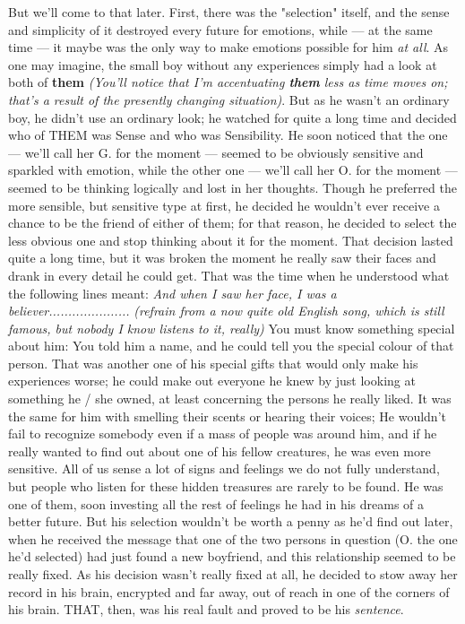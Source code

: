 But we'll come to that later. First, there was the "selection" itself, and the sense and simplicity of it destroyed every future for emotions, while --- at the same time --- it maybe was the only way to make emotions possible for him \emph{at all}. 
As one may imagine, the small boy without any experiences simply had a look at both of \textbf{them} \emph{(You'll notice that I'm accentuating \textbf{them} less as time moves on; that's a result of the presently changing situation)}. But as he wasn't an ordinary boy, he didn't use an ordinary look; he watched for quite a long time and decided who of THEM was Sense and who was Sensibility. He soon noticed that the one --- we'll call her G. for the moment --- seemed to be obviously sensitive and sparkled with emotion, while the other one --- we'll call her O. for the moment --- seemed to be thinking logically and lost in her thoughts. Though he preferred the more sensible, but sensitive type at first, he decided he wouldn't ever receive a chance to be the friend of either of them; for that reason, he decided to select the less obvious one and stop thinking about it for the moment. That decision lasted quite a long time, but it was broken the moment he really saw their faces and drank in every detail he could get.
That was the time when he understood what the following lines meant:
\emph{And when I saw her face,
I was a believer.....................}
\emph{(refrain from a now quite old English song, which is still famous, but nobody I know listens to it, really)}
You must know something special about him: You told him a name, and he could tell you the special colour of that person. That was another one of his special gifts that would only make his experiences worse; he could make out everyone he knew by just looking at something he / she owned, at least concerning the persons he really liked. It was the same for him with smelling their scents or hearing their voices; He wouldn't fail to recognize somebody even if a mass of people was around him, and if he really wanted to find out about one of his fellow creatures, he was even more sensitive. All of us sense a lot of signs and feelings we do not fully understand, but people who listen for these hidden treasures are rarely to be found. 
He was one of them, soon investing all the rest of feelings he had in his dreams of a better future. But his selection wouldn't be worth a penny as he'd find out later, when he received the message that one of the two persons in question (O. the one he'd selected) had just found a new boyfriend, and this relationship seemed to be really fixed. As his decision wasn't really fixed at all, he decided to stow away her record in his brain, encrypted and far away, out of reach in one of the corners of his brain. THAT, then, was his real fault and proved to be his \emph{sentence}. 
